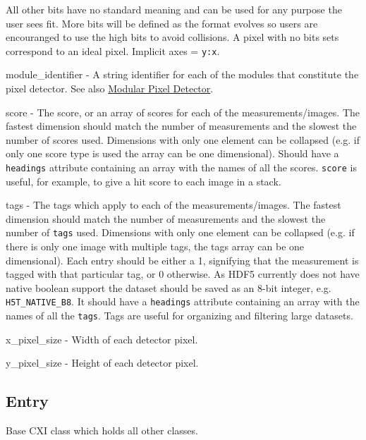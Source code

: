 \documentclass[usletter,11pt]{article}
\newcommand{\member}[2]
{ \noindent
{ \color{softBlue}  #1 - } #2
\vspace{0.2cm}
}
\begin{document}
All other bits have no standard meaning and can be used for any
purpose the user sees fit. More bits will be defined as the format
evolves so users are encouranged to use the high bits to avoid collisions.
A pixel with no bits sets correspond to an ideal pixel.
Implicit axes = {\tt y:x}.

\member{module\_identifier}{A string identifier for each of the modules that
  constitute the pixel detector. See also \hyperref[subsec:modularDetectors]{Modular Pixel Detector}.}

\member{score}{The score, or an array of scores for each of the measurements/images. The
  fastest dimension should match the number of measurements and the slowest the
  number of scores used. Dimensions with only one element can be collapsed
  (e.g. if only one score type is used the array can be one dimensional).
  Should have a {\tt headings} attribute containing an
  array with the names of all the scores. {\tt score} is useful, for example,
  to give a hit score to each image in a stack.}

\member{tags}{The tags which apply to each of the measurements/images. The
  fastest dimension should match the number of measurements and the slowest
  the number of {\tt tags} used. Dimensions with only one element can be collapsed
  (e.g. if there is only one image with multiple tags, the tags array can be one dimensional).
  Each entry should be either a 1, signifying
  that the measurement is tagged with that particular tag, or 0 otherwise.
  As HDF5 currently does not have native boolean support the dataset should be
  saved as an 8-bit integer, e.g. {\tt H5T\_NATIVE\_B8}. 
  It should have a {\tt headings} attribute containing an array with the names
  of all the {\tt tags}. Tags are useful for organizing and filtering large
  datasets.}

   

\member{x\_pixel\_size}{Width of each detector pixel.}

\member{y\_pixel\_size}{Height of each detector pixel.}




\subsection{Entry}
\label{table:entry}

Base CXI class which holds all other classes.
\end{document}
